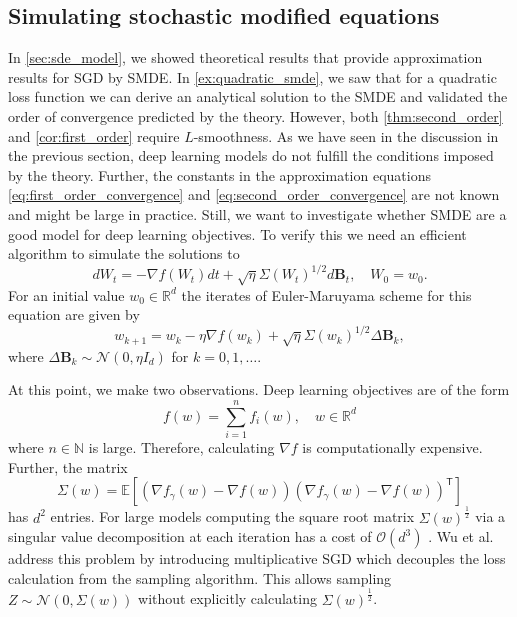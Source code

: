 \documentclass[12pt]{article}
\theoremstyle{definition}
\numberwithin{equation}{section}
\newcommand{\N}{\mathbb{N}}
\newcommand{\R}{\mathbb{R}}
\newcommand{\CN}{\mathcal{N}}
\newcommand{\CO}{\mathcal{O}}
\newcommand{\T}{\mathsf{T}}
\newcommand{\ev}[1]{\mathbb{E}\left[{#1}\right]}
\begin{document}
\subsection{Simulating stochastic modified equations}
In \autoref{sec:sde_model}, we showed theoretical results that provide approximation results for SGD by SMDE. 
In \autoref{ex:quadratic_smde}, we saw that for a quadratic loss function we can derive an analytical solution to the SMDE and validated the order of convergence predicted by the theory.
However, both \autoref{thm:second_order} and \autoref{cor:first_order} require $L$-smoothness. As we have seen in the discussion in the previous section, deep learning models do not fulfill the conditions imposed by the theory. Further, the constants in the approximation equations \eqref{eq:first_order_convergence} and \eqref{eq:second_order_convergence} are not known and might be large in practice. 
Still, we want to investigate whether SMDE are a good model for deep learning objectives. To verify this we need an efficient algorithm to simulate the solutions to 
\begin{equation}
  d W_t = -\nabla f(W_t) dt + \sqrt{\eta}\Sigma(W_t)^{1/2}d\mathbf{B}_t, \quad W_0 = w_0.
\end{equation}
For an initial value $w_0 \in \R^d$ the iterates of Euler-Maruyama scheme for this equation are given by 
\begin{equation}
  w_{k+1} = w_k -\eta\nabla f(w_k) + \sqrt{\eta}\Sigma(w_k)^{1/2} \Delta \mathbf{B}_k,
\end{equation}
where $\Delta \mathbf{B}_k \sim \CN(0, \eta I_d)$ for $k=0,1,\dots$.

At this point, we make two observations. Deep learning objectives are of the form
\begin{equation*}
  f(w) = \sum_{i=1}^n f_i(w), \quad w \in \R^d
\end{equation*}
where $n \in \N$ is large. Therefore, calculating $\nabla f$ is computationally expensive. Further, the matrix
\begin{equation*}
  \Sigma(w)= \ev{(\nabla f_{\gamma}(w) - \nabla f(w))(\nabla f_{\gamma}(w) - \nabla f(w))^\T}
\end{equation*}
has $d^2$ entries. For large models computing the square root matrix $\Sigma(w)^{\frac{1}{2}}$ via a singular value decomposition at each iteration has a cost of $\CO(d^3)$ \cite{golubMatrixComputations1996}.
Wu et al. \cite{wuNoisyGradientDescent2020a} address this problem by introducing multiplicative SGD which decouples the loss calculation from the sampling algorithm. This allows sampling $Z \sim \CN(0, \Sigma(w))$ without explicitly calculating $\Sigma(w)^{\frac{1}{2}}$.
\end{document}
